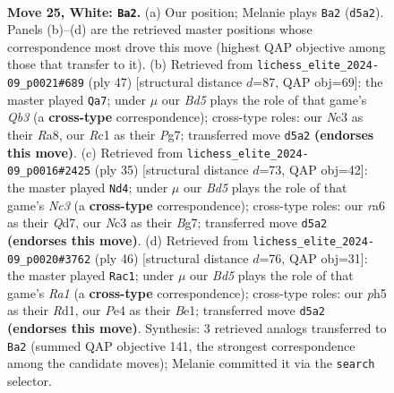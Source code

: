 \documentclass[11pt]{article}
\begin{document}
\clearpage

\begin{figure}[p]\centering
\begin{subfigure}{0.46\textwidth}\centering
\resizebox{\linewidth}{!}{%
\newchessgame
\chessboard[
  setfen={1n2r1k1/4qpp1/rp1pbn2/3Bp2p/P3P2N/2N3P1/2PQ1P1P/R1R3K1 w - - 11 25},
  showmover=false,
  pgfstyle=straightmove, color=movearrow, markmove={d5-a2}
]}
\caption{}
\end{subfigure}\hfill
\begin{subfigure}{0.46\textwidth}\centering
\resizebox{\linewidth}{!}{%
\newchessgame
\chessboard[
  setfen={r2r2k1/1p3ppp/1qn3b1/pBn5/P1Np4/5N1P/1P2QPP1/2RR2K1 b - - 1 24},
  showmover=false,
  pgfstyle=straightmove, color=movearrow, markmove={b6-a7}
]}
\caption{}
\end{subfigure}
\\[4pt]
\begin{subfigure}{0.46\textwidth}\centering
\resizebox{\linewidth}{!}{%
\newchessgame
\chessboard[
  setfen={r5k1/1ppq1pb1/1nn1r1pp/1P2p3/8/3P1NN1/2PB1PPP/1R1QR1K1 b - - 0 18},
  showmover=false,
  pgfstyle=straightmove, color=movearrow, markmove={c6-d4}
]}
\caption{}
\end{subfigure}\hfill
\begin{subfigure}{0.46\textwidth}\centering
\resizebox{\linewidth}{!}{%
\newchessgame
\chessboard[
  setfen={2rq2k1/1b1r1ppp/1p2pnn1/p7/P2PP3/2N1Q1P1/1P4BP/R2RB1K1 w - - 3 24},
  showmover=false,
  pgfstyle=straightmove, color=movearrow, markmove={a1-c1}
]}
\caption{}
\end{subfigure}
\caption{\textbf{Move 25, White: \texttt{Ba2}.} (a) Our position; Melanie plays \texttt{Ba2} (\texttt{d5a2}). Panels (b)--(d) are the retrieved master positions whose correspondence most drove this move (highest QAP objective among those that transfer to it). (b) Retrieved from \texttt{lichess\_elite\_2024-09\_p0021\#689} (ply 47) [structural distance $d$=87, QAP obj=69]: the master played \texttt{Qa7}; under $\mu$ our \emph{Bd5} plays the role of that game's \emph{Qb3} (a \textbf{cross-type} correspondence); cross-type roles: our \emph{N}c3 as their \emph{R}a8, our \emph{R}c1 as their \emph{P}g7; transferred move \texttt{d5a2} \textbf{(endorses this move)}. (c) Retrieved from \texttt{lichess\_elite\_2024-09\_p0016\#2425} (ply 35) [structural distance $d$=73, QAP obj=42]: the master played \texttt{Nd4}; under $\mu$ our \emph{Bd5} plays the role of that game's \emph{Nc3} (a \textbf{cross-type} correspondence); cross-type roles: our \emph{r}a6 as their \emph{Q}d7, our \emph{N}c3 as their \emph{B}g7; transferred move \texttt{d5a2} \textbf{(endorses this move)}. (d) Retrieved from \texttt{lichess\_elite\_2024-09\_p0020\#3762} (ply 46) [structural distance $d$=76, QAP obj=31]: the master played \texttt{Rac1}; under $\mu$ our \emph{Bd5} plays the role of that game's \emph{Ra1} (a \textbf{cross-type} correspondence); cross-type roles: our \emph{p}h5 as their \emph{R}d1, our \emph{P}e4 as their \emph{B}e1; transferred move \texttt{d5a2} \textbf{(endorses this move)}. Synthesis: 3 retrieved analogs transferred to \texttt{Ba2} (summed QAP objective 141, the strongest correspondence among the candidate moves); Melanie committed it via the \texttt{search} selector.}

\end{figure}
\end{document}
